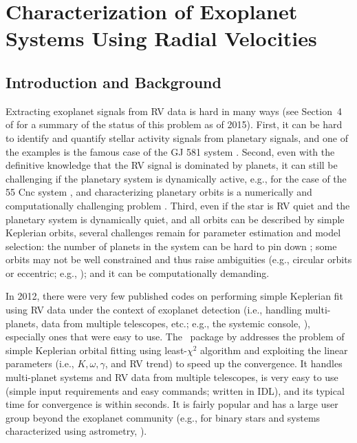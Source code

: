 \chapter{Characterization of Exoplanet Systems Using Radial
  Velocities}\label{chap:boottran}


\section{Introduction and Background}\label{boottran:sec:intro}

Extracting exoplanet signals from RV data is hard in many ways (see
Section~4 of \citealt{eprv2015} for a summary of the status of this
problem as of 2015). First, it can be hard to identify and quantify
stellar activity signals from planetary signals, and one of the
examples is the famous case of the GJ 581 system
\citep{2009A&A...507..487M, 2010ApJ...723..954V, 2013AN....334..616H,
  2014Sci...345..440R, 2015Sci...347.1080A,
  2015Sci...347.1080R}. Second, even with the definitive knowledge
that the RV signal is dominated by planets, it can still be
challenging if the planetary system is dynamically active, e.g., for
the case of the 55 Cnc system \citep{2014MNRAS.441..442N}, and
characterizing planetary orbits is a numerically and computationally
challenging problem \citep{2014ApJS..210...11N}. Third, even if the
star is RV quiet and the planetary system is dynamically quiet, and
all orbits can be described by simple Keplerian orbits, several
challenges remain for parameter estimation
and model selection: the number of
planets in the system can be hard to pin down
\citep{2015ApJ...814...12V, 2015A&A...584A..72M, 2016arXiv160205200J};
some orbits may not be well constrained and thus raise ambiguities
(e.g., circular orbits or eccentric; e.g.,
\citealt{2010ApJ...709..168A, 2013ApJS..208....2W,
  2015A&A...577A.103K}); and it can be computationally demanding.

In 2012, there were very few published codes on performing simple
Keplerian fit using RV data under the context of exoplanet detection
(i.e., handling multi-planets, data from multiple telescopes, etc.;
e.g., the systemic console, \citealt{2009PASP..121.1016M}), especially
ones that were easy to use. The \rvlin\ package by \cite{rvlin}
addresses the problem of simple Keplerian orbital fitting using
least-$\chi^2$ algorithm and exploiting the linear parameters (i.e.,
$K, \omega, \gamma$, and RV trend) to speed up the convergence. It
handles multi-planet systems and RV data from multiple telescopes, is
very easy to use (simple input requirements and easy commands; written
in IDL), and its typical time for convergence is within seconds. It is
fairly popular and has a large user group beyond the exoplanet
community (e.g., for binary stars and systems characterized using
astrometry, \citealt{2016AJ....151...57K}).

